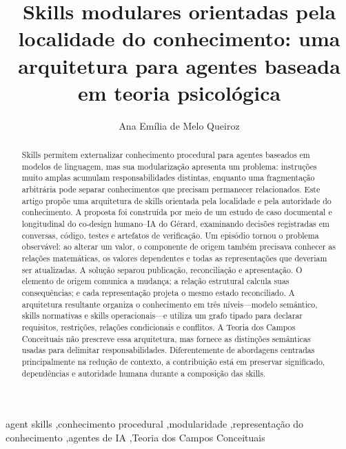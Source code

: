 \documentclass[preprint,12pt,authoryear]{elsarticle}
\newcommand{\gerard}{Gérard\xspace}
\begin{document}
\begin{frontmatter}

\title{Skills modulares orientadas pela localidade do conhecimento: uma arquitetura para agentes baseada em teoria psicológica}

\author[univasf]{Ana Emília de Melo Queiroz}
\address[univasf]{Universidade Federal do Vale do São Francisco, Brasil}

\begin{abstract}
Skills permitem externalizar conhecimento procedural para agentes baseados em modelos de linguagem, mas sua modularização apresenta um problema: instruções muito amplas acumulam responsabilidades distintas, enquanto uma fragmentação arbitrária pode separar conhecimentos que precisam permanecer relacionados. Este artigo propõe uma arquitetura de skills orientada pela localidade e pela autoridade do conhecimento. A proposta foi construída por meio de um estudo de caso documental e longitudinal do co-design humano--IA do \gerard, examinando decisões registradas em conversas, código, testes e artefatos de verificação. Um episódio tornou o problema observável: ao alterar um valor, o componente de origem também precisava conhecer as relações matemáticas, os valores dependentes e todas as representações que deveriam ser atualizadas. A solução separou publicação, reconciliação e apresentação. O elemento de origem comunica a mudança; a relação estrutural calcula suas consequências; e cada representação projeta o mesmo estado reconciliado. A arquitetura resultante organiza o conhecimento em três níveis---modelo semântico, skills normativas e skills operacionais---e utiliza um grafo tipado para declarar requisitos, restrições, relações condicionais e conflitos. A Teoria dos Campos Conceituais não prescreve essa arquitetura, mas fornece as distinções semânticas usadas para delimitar responsabilidades. Diferentemente de abordagens centradas principalmente na redução de contexto, a contribuição está em preservar significado, dependências e autoridade humana durante a composição das skills.
\end{abstract}

\begin{keyword}
agent skills \sep conhecimento procedural \sep modularidade \sep representação do conhecimento \sep agentes de IA \sep Teoria dos Campos Conceituais
\end{keyword}

\end{frontmatter}
\end{document}
